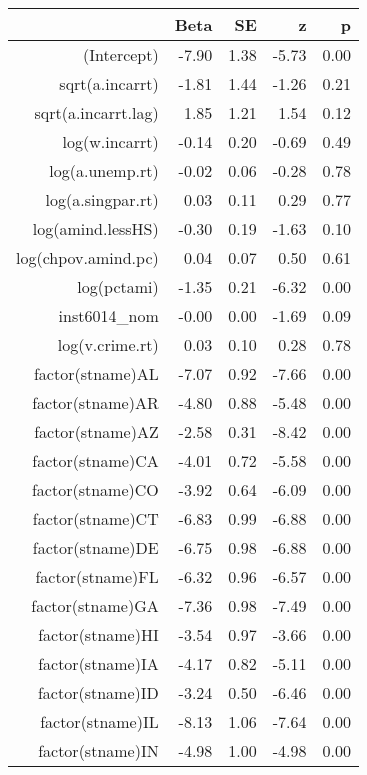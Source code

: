 \begin{table}[ht]
\centering
\begin{tabular}{rrrrr}
  \hline
 & Beta & SE & z & p \\ 
  \hline
(Intercept) & -7.90 & 1.38 & -5.73 & 0.00 \\ 
  sqrt(a.incarrt) & -1.81 & 1.44 & -1.26 & 0.21 \\ 
  sqrt(a.incarrt.lag) & 1.85 & 1.21 & 1.54 & 0.12 \\ 
  log(w.incarrt) & -0.14 & 0.20 & -0.69 & 0.49 \\ 
  log(a.unemp.rt) & -0.02 & 0.06 & -0.28 & 0.78 \\ 
  log(a.singpar.rt) & 0.03 & 0.11 & 0.29 & 0.77 \\ 
  log(amind.lessHS) & -0.30 & 0.19 & -1.63 & 0.10 \\ 
  log(chpov.amind.pc) & 0.04 & 0.07 & 0.50 & 0.61 \\ 
  log(pctami) & -1.35 & 0.21 & -6.32 & 0.00 \\ 
  inst6014\_nom & -0.00 & 0.00 & -1.69 & 0.09 \\ 
  log(v.crime.rt) & 0.03 & 0.10 & 0.28 & 0.78 \\ 
  factor(stname)AL & -7.07 & 0.92 & -7.66 & 0.00 \\ 
  factor(stname)AR & -4.80 & 0.88 & -5.48 & 0.00 \\ 
  factor(stname)AZ & -2.58 & 0.31 & -8.42 & 0.00 \\ 
  factor(stname)CA & -4.01 & 0.72 & -5.58 & 0.00 \\ 
  factor(stname)CO & -3.92 & 0.64 & -6.09 & 0.00 \\ 
  factor(stname)CT & -6.83 & 0.99 & -6.88 & 0.00 \\ 
  factor(stname)DE & -6.75 & 0.98 & -6.88 & 0.00 \\ 
  factor(stname)FL & -6.32 & 0.96 & -6.57 & 0.00 \\ 
  factor(stname)GA & -7.36 & 0.98 & -7.49 & 0.00 \\ 
  factor(stname)HI & -3.54 & 0.97 & -3.66 & 0.00 \\ 
  factor(stname)IA & -4.17 & 0.82 & -5.11 & 0.00 \\ 
  factor(stname)ID & -3.24 & 0.50 & -6.46 & 0.00 \\ 
  factor(stname)IL & -8.13 & 1.06 & -7.64 & 0.00 \\ 
  factor(stname)IN & -4.98 & 1.00 & -4.98 & 0.00 \\ 

\end{tabular}
\end{table}
